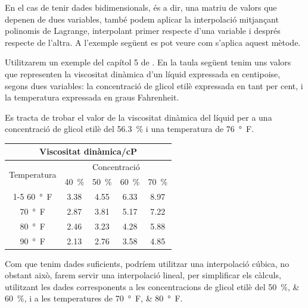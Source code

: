 En el cas de tenir dades bidimensionals, és a dir, una matriu de valors que depenen de dues variables, també podem aplicar la interpolació  mitjançant polinomis de Lagrange, interpolant primer respecte d'una variable i després respecte de l'altra. A l'exemple següent es pot veure com s'aplica aquest mètode.

	
\begin{exemple}\label{ex:InterpDuesDim}
	\addcontentsxms{\InterpDuesDim}	
    Utilitzarem un exemple del capítol 5 de \cite{EJB}. En la taula següent tenim uns valors que representen la viscositat dinàmica d'un líquid expressada en centipoise, segons dues variables: la concentració de glicol etilè
    expressada en tant per cent, i la temperatura expressada en graus Fahrenheit.
    
    Es tracta de trobar el valor de la viscositat dinàmica del líquid per a una concentració de glicol etilè
    del \qty{56,3}{\percent} i una temperatura de \qty{76}{\degree F}.

    \begin{center}
       \begin{tabular}{ccccc}
       \multicolumn{5}{c}{Viscositat dinàmica/cP}\\
       \toprule[1pt]
       \multirow{2}{25mm}{\rule{0mm}{4.5mm}Temperatura} & \multicolumn{4}{c}{Concentració}\\
       \cmidrule(rl){2-5}
                            & \qty{40}{\percent} & \qty{50}{\percent} & \qty{60}{\percent} & \qty{70}{\percent} \\
       \cmidrule(lr){1-5}
       \qty{60}{\degree F}  & \num{3,38}  & \num{4,55}  & \num{6,33}  & \num{8,97} \\
       \qty{70}{\degree F}  & \num{2,87}  & \num{3,81}  & \num{5,17}  & \num{7,22} \\
       \qty{80}{\degree F}  & \num{2,46}  & \num{3,23}  & \num{4,28}  & \num{5,88} \\
       \qty{90}{\degree F}  & \num{2,13}  & \num{2,76}  & \num{3,58}  & \num{4,85} \\
       \bottomrule[1pt]
       \end{tabular}
    \end{center}

    

    Com que tenim dades suficients, podríem utilitzar una interpolació cúbica, no obstant això, farem servir una interpolació lineal, per simplificar els càlculs, utilitzant les dades corresponents  a les concentracions de glicol etilè del  \qtylist{50;60}{\percent}, i a les temperatures de  \qtylist{70;80}{\degree F}.


\end{exemple}

